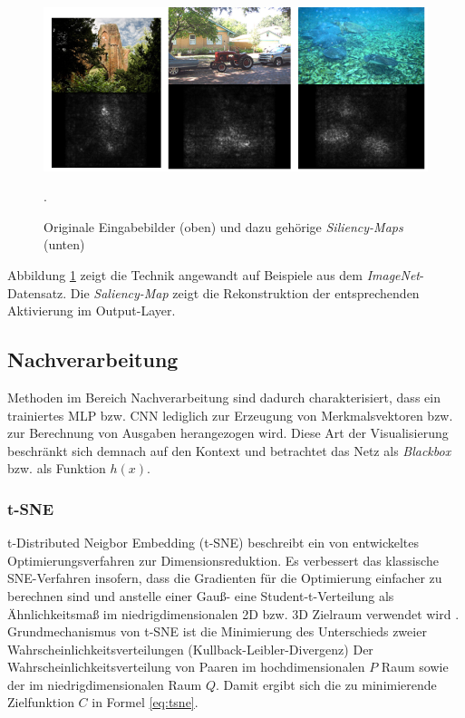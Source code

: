 \begin{figure}
\centering
\includegraphics[width=0.6\linewidth]{images/4_simonyan}
\caption[]{Originale Eingabebilder (oben) und dazu gehörige \textit{Siliency-Maps} (unten) \cite[siehe][]{Simonyan2013}}.
\label{fig:4_simonyan}
\end{figure}

Abbildung \ref{fig:4_simonyan} zeigt die Technik angewandt auf Beispiele aus dem \textit{ImageNet}-Datensatz. Die \textit{Saliency-Map} zeigt die Rekonstruktion der entsprechenden Aktivierung im Output-Layer. 

\subsection{Nachverarbeitung}
Methoden im Bereich Nachverarbeitung sind dadurch charakterisiert, dass ein trainiertes MLP bzw. CNN lediglich zur Erzeugung von Merkmalsvektoren bzw. zur Berechnung von Ausgaben herangezogen wird. Diese Art der Visualisierung beschränkt sich demnach auf den Kontext und betrachtet das Netz als \textit{Blackbox} bzw. als Funktion $h(x)$.


\subsubsection{t-SNE}

t-Distributed Neigbor Embedding (t-SNE) beschreibt ein von \cite{Laurens2008} entwickeltes Optimierungsverfahren zur Dimensionsreduktion. Es verbessert das klassische SNE-Verfahren insofern, dass die Gradienten für die Optimierung einfacher zu berechnen sind und anstelle einer Gauß- eine Student-t-Verteilung als Ähnlichkeitsmaß im niedrigdimensionalen 2D bzw. 3D Zielraum verwendet wird \cite[vgl.][]{Laurens2008}. Grundmechanismus von t-SNE ist die Minimierung des Unterschieds zweier Wahrscheinlichkeitsverteilungen (Kullback-Leibler-Divergenz) \textemdash \space Der Wahrscheinlichkeitsverteilung von Paaren im hochdimensionalen $P$ Raum sowie der im niedrigdimensionalen Raum $Q$. Damit ergibt sich die zu minimierende Zielfunktion $C$ in Formel \ref{eq:tsne}.


